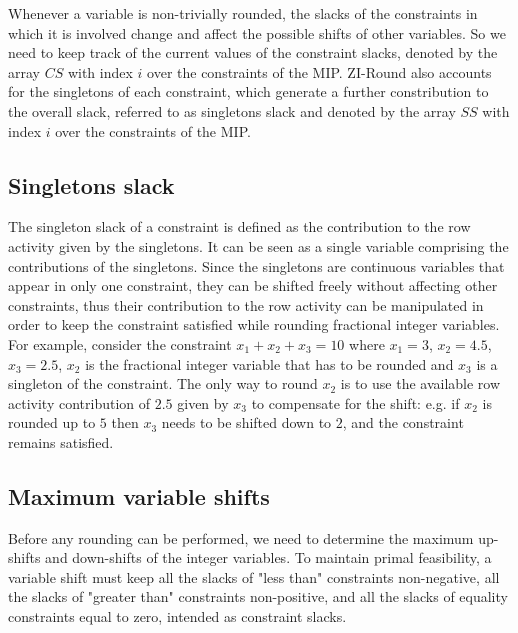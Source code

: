 \documentclass[a4paper,12pt]{book}
\begin{document}
Whenever a variable is non-trivially rounded, the slacks of the constraints in which it is involved change and affect the possible shifts of other variables. So we need to keep track of the current values of the constraint slacks, denoted by the array $CS$ with index $i$ over the constraints of the MIP.
ZI-Round also accounts for the singletons of each constraint, which generate a further constribution to the overall slack, referred to as singletons slack and denoted by the array $SS$ with index $i$ over the constraints of the MIP. \par 

\subsection{Singletons slack}
The singleton slack of a constraint is defined as the contribution to the row activity given by the singletons. It can be seen as a single variable comprising the contributions of the singletons. 
Since the singletons are continuous variables that appear in only one constraint, they can be shifted freely without affecting other constraints, thus their contribution to the row activity can be manipulated in order to keep the constraint satisfied while rounding fractional integer variables. For example, consider the constraint $x_1 + x_2 + x_3 = 10$ where $x_1 = 3$, $x_2 = 4.5$, $x_3 = 2.5$, $x_2$ is the fractional integer variable that has to be rounded and $x_3$ is a singleton of the constraint. The only way to round $x_2$ is to use the available row activity contribution of $2.5$ given by $x_3$ to compensate for the shift: e.g. if $x_2$ is rounded up to $5$ then $x_3$ needs to be shifted down to $2$, and the constraint remains satisfied. \par 

\subsection{Maximum variable shifts}
Before any rounding can be performed, we need to determine the maximum up-shifts and down-shifts of the integer variables. To maintain primal feasibility, a variable shift must keep all the slacks of "less than" constraints non-negative, all the slacks of "greater than" constraints non-positive, and all the slacks of equality constraints equal to zero, intended as constraint slacks. \par
\end{document}
